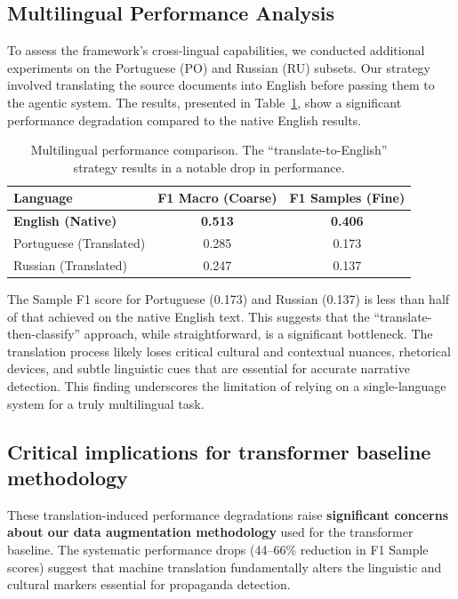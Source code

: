 \subsection{Multilingual Performance Analysis}

To assess the framework's cross-lingual capabilities, we conducted additional experiments on the Portuguese (PO) and Russian (RU) subsets. Our strategy involved translating the source documents into English before passing them to the agentic system. The results, presented in Table~\ref{tab:multilingual-performance}, show a significant performance degradation compared to the native English results.

\begin{table}[htbp]
\centering
\caption{Multilingual performance comparison. The ``translate-to-English'' strategy results in a notable drop in performance.}
\label{tab:multilingual-performance}
\begin{tabular}{lcc}
\toprule
\textbf{Language} & \textbf{F1 Macro (Coarse)} & \textbf{F1 Samples (Fine)} \\
\midrule
\textbf{English (Native)} & \textbf{0.513} & \textbf{0.406} \\
Portuguese (Translated) & 0.285 & 0.173 \\
Russian (Translated) & 0.247 & 0.137 \\
\bottomrule
\end{tabular}
\end{table}

The Sample F1 score for Portuguese (0.173) and Russian (0.137) is less than half of that achieved on the native English text. This suggests that the ``translate-then-classify'' approach, while straightforward, is a significant bottleneck. The translation process likely loses critical cultural and contextual nuances, rhetorical devices, and subtle linguistic cues that are essential for accurate narrative detection. This finding underscores the limitation of relying on a single-language system for a truly multilingual task.

\subsection{Critical implications for transformer baseline methodology}

\begin{tcolorbox}[colback=yellow!10,colframe=orange!75!black,title=\textbf{Important Methodological Insight}]
These translation-induced performance degradations raise \textbf{significant concerns about our data augmentation methodology} used for the transformer baseline. The systematic performance drops (44--66\% reduction in F1 Sample scores) suggest that machine translation fundamentally alters the linguistic and cultural markers essential for propaganda detection.
\end{tcolorbox}

